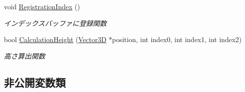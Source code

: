 \begin{DoxyCompactItemize}
void \mbox{\hyperlink{class_mesh_plane_polygon_aab346c974196e257399095dd914aaa51}{Registration\+Index}} ()
\begin{DoxyCompactList}\small\item\em インデックスバッファに登録関数 \end{DoxyCompactList}\item 
bool \mbox{\hyperlink{class_mesh_plane_polygon_ab4337151c2a4409a882f254db20138e5}{Calculation\+Height}} (\mbox{\hyperlink{class_vector3_d}{Vector3D}} $\ast$position, int index0, int index1, int index2)
\begin{DoxyCompactList}\small\item\em 高さ算出関数 \end{DoxyCompactList}\end{DoxyCompactItemize}
\subsection*{非公開変数類}
